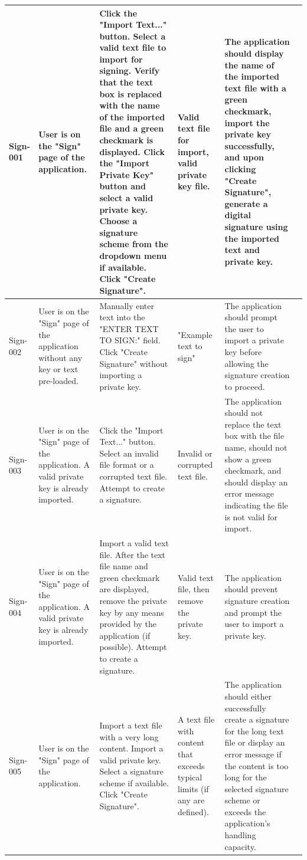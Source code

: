 \documentclass[]{final_report}
\theoremstyle{definition}
\begin{document}
\begin{longtable}{|l|p{2.5cm}|p{2.8cm}|p{2cm}|p{2cm}|p{2cm}|}
  Sign-001 & User is on the "Sign" page of the application. & Click the "Import Text..." button. Select a valid text file to import for signing. Verify that the text box is replaced with the name of the imported file and a green checkmark is displayed. Click the "Import Private Key" button and select a valid private key. Choose a signature scheme from the dropdown menu if available. Click "Create Signature". & Valid text file for import, valid private key file. & The application should display the name of the imported text file with a green checkmark, import the private key successfully, and upon clicking "Create Signature", generate a digital signature using the imported text and private key. & \\
  \hline
  Sign-002 & User is on the "Sign" page of the application without any key or text pre-loaded. & Manually enter text into the "ENTER TEXT TO SIGN:" field. Click "Create Signature" without importing a private key. & "Example text to sign" & The application should prompt the user to import a private key before allowing the signature creation to proceed. & \\
  \hline
  Sign-003 & User is on the "Sign" page of the application. A valid private key is already imported. & Click the "Import Text..." button. Select an invalid file format or a corrupted text file. Attempt to create a signature. & Invalid or corrupted text file. & The application should not replace the text box with the file name, should not show a green checkmark, and should display an error message indicating the file is not valid for import. & \\
  \hline
  Sign-004 & User is on the "Sign" page of the application. A valid private key is already imported. & Import a valid text file. After the text file name and green checkmark are displayed, remove the private key by any means provided by the application (if possible). Attempt to create a signature. & Valid text file, then remove the private key. & The application should prevent signature creation and prompt the user to import a private key. & \\
  \hline
  Sign-005 & User is on the "Sign" page of the application. & Import a text file with a very long content. Import a valid private key. Select a signature scheme if available. Click "Create Signature". & A text file with content that exceeds typical limits (if any are defined). & The application should either successfully create a signature for the long text file or display an error message if the content is too long for the selected signature scheme or exceeds the application's handling capacity. & \\
  \hline
\end{longtable}
\end{document}
